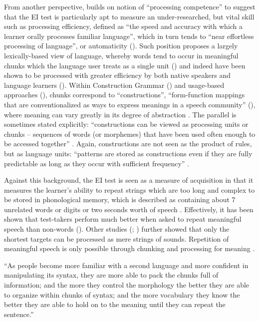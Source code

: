 From another perspective, \citet[325–326]{Van-Moere2012} builds on  notion of “processing competence” to suggest that the EI test is particularly apt to measure an under-researched, but vital skill such as processing efficiency, defined as “the speed and accuracy with which a learner orally processes familiar language”, which in turn tends to “near effortless processing of language”, or automaticity (\citealt{DeKeyser2001}). Such position proposes a largely lexically-based view of language, whereby words tend to occur in meaningful chunks which the language user treats as a single unit (\citealt{PawleySyder1983, Ellis2001}) and indeed have been shown to be processed with greater efficiency by both native speakers and language learners (\citealt{ConklinSchmitt2008}). Within Construction Grammar (\citealt{GriesWulff2005, HoffmannTrousdale2013}) and usage-based approaches (\citealt{Tomasello2005, CadiernoEskildsen2015, TylerOrtega2016}), chunks correspond to “constructions”, “form-function mappings that are conventionalized as ways to express meanings in a speech community” (\citealt[38]{WulffEllis2018}), where meaning can vary greatly in its degree of abstraction \citep{Goldberg2006}. The parallel is sometimes stated explicitly: “constructions can be viewed as processing units or chunks – sequences of words (or morphemes) that have been used often enough to be accessed together” \citep[51]{Bybee2013}. Again, constructions are not seen as the product of rules, but as language units: “patterns are stored as constructions even if they are fully predictable as long as they occur with sufficient frequency” \citep[5]{Goldberg1995}. 

Against this background, the EI test is seen as a measure of acquisition in that it measures the learner’s ability to repeat strings which are too long and complex to be stored in phonological memory, which is described as containing about 7 unrelated words or digits \citep{Miller1956} or two seconds worth of speech \citep{Baddeley1986}. Effectively, it has been shown that test-takers perform much better when asked to repeat meaningful speech than non-words (\citealt{GathercoleBaddeley2004}). Other studies (\citealt[86]{Underhill1987}; \citealt[79]{Buck2001}) further showed that only the shortest targets can be processed as mere strings of sounds. Repetition of meaningful speech is only possible through chunking and processing for meaning \citep[9]{Radloff1991}.

“As people become more familiar with a second language and more confident in manipulating its syntax, they are more able to pack the chunks full of information; and the more they control the morphology the better they are able to organize within chunks of syntax; and the more vocabulary they know the better they are able to hold on to the meaning until they can repeat the sentence.”

